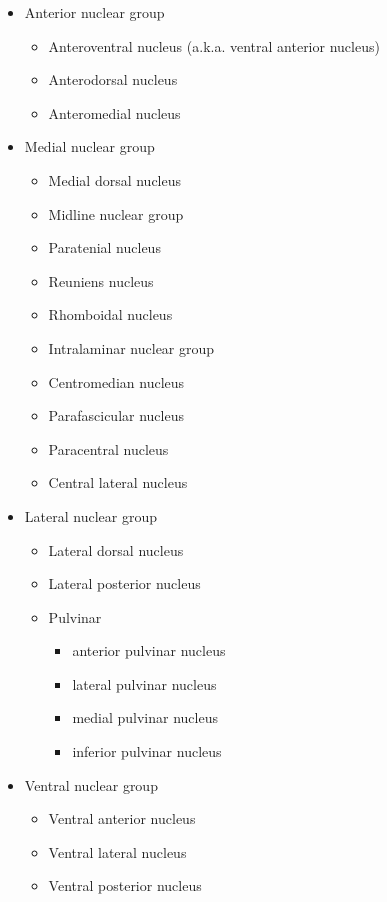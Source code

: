 \begin{itemize}
\tightlist
\item
  Anterior nuclear group

  \begin{itemize}
  \tightlist
  \item
    Anteroventral nucleus (a.k.a. ventral anterior nucleus)
  \item
    Anterodorsal nucleus
  \item
    Anteromedial nucleus
  \end{itemize}
\item
  Medial nuclear group

  \begin{itemize}
  \tightlist
  \item
    Medial dorsal nucleus
  \item
    Midline nuclear group
  \item
    Paratenial nucleus
  \item
    Reuniens nucleus
  \item
    Rhomboidal nucleus
  \item
    Intralaminar nuclear group
  \item
    Centromedian nucleus
  \item
    Parafascicular nucleus
  \item
    Paracentral nucleus
  \item
    Central lateral nucleus
  \end{itemize}
\item
  Lateral nuclear group

  \begin{itemize}
  \tightlist
  \item
    Lateral dorsal nucleus
  \item
    Lateral posterior nucleus
  \item
    Pulvinar

    \begin{itemize}
    \tightlist
    \item
      anterior pulvinar nucleus
    \item
      lateral pulvinar nucleus
    \item
      medial pulvinar nucleus
    \item
      inferior pulvinar nucleus
    \end{itemize}
  \end{itemize}
\item
  Ventral nuclear group

  \begin{itemize}
  \tightlist
  \item
    Ventral anterior nucleus
  \item
    Ventral lateral nucleus
  \item
    Ventral posterior nucleus


\end{itemize}
\end{itemize}
